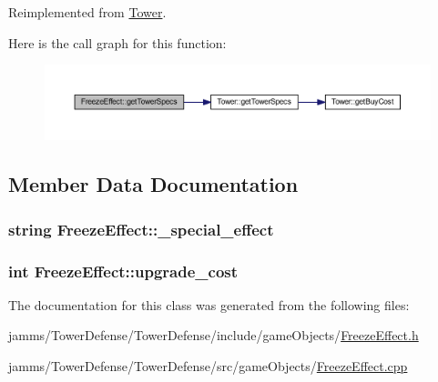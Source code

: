 Reimplemented from \hyperlink{class_tower_a2427fab36824f8ec98273cb5e563e0c9}{Tower}.



Here is the call graph for this function\+:
\nopagebreak
\begin{figure}[H]
\begin{center}
\leavevmode
\includegraphics[width=350pt]{class_freeze_effect_ace1230a2379fb2ec5894bcdf20e69ae9_cgraph}
\end{center}
\end{figure}




\subsection{Member Data Documentation}
\hypertarget{class_freeze_effect_a434cb05a2101ccdc67b8b0652e96dd31}{
\subsubsection[{\+\_\+special\+\_\+effect}]{\setlength{\rightskip}{0pt plus 5cm}string Freeze\+Effect\+::\+\_\+special\+\_\+effect\hspace{0.3cm}{\ttfamily [private]}}}\label{class_freeze_effect_a434cb05a2101ccdc67b8b0652e96dd31}
\hypertarget{class_freeze_effect_a7dfd4fc059dffcfbd1f395a292cc0014}{
\subsubsection[{upgrade\+\_\+cost}]{\setlength{\rightskip}{0pt plus 5cm}int Freeze\+Effect\+::upgrade\+\_\+cost\hspace{0.3cm}{\ttfamily [static]}}}\label{class_freeze_effect_a7dfd4fc059dffcfbd1f395a292cc0014}


The documentation for this class was generated from the following files\+:\begin{DoxyCompactItemize}
\item 
jamms/\+Tower\+Defense/\+Tower\+Defense/include/game\+Objects/\hyperlink{_freeze_effect_8h}{Freeze\+Effect.\+h}\item 
jamms/\+Tower\+Defense/\+Tower\+Defense/src/game\+Objects/\hyperlink{_freeze_effect_8cpp}{Freeze\+Effect.\+cpp}\end{DoxyCompactItemize}
